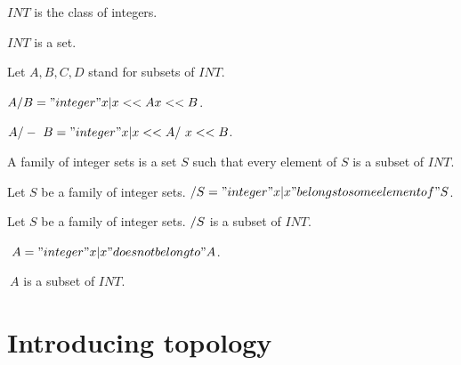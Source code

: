 \documentclass{document}
\begin{document}
  \begin{forthel}
    \begin{definition}
      $INT$ is the class of integers.
    \end{definition}

    \begin{axiom}
      $INT$ is a set.
    \end{axiom}

    Let $A,B,C,D$ stand for subsets of $INT$.

    \begin{definition}[Union]
      $A \-/ B = { "integer" x | x << A \/ x << B }$.
    \end{definition}

    \begin{definition}[Intersection]
      $A /-\ B = { "integer" x | x << A /\ x << B }$.
    \end{definition}

    \begin{definition}[IntegerSets]
      A family of integer sets is a set $S$ such that every element of $S$ is a subset of $INT$.
    \end{definition}

    \begin{definition}[UnionSet]
      Let $S$ be a family of integer sets. $\-/ S = { "integer" x | x "belongs to some element of" S }$.
    \end{definition}

    \begin{lemma}
      Let $S$ be a family of integer sets. $\-/S$ is a subset of $INT$.
    \end{lemma}

    \begin{definition}[Complement]
      $~ A = { "integer" x | x "does not belong to" A }$.
    \end{definition}

    \begin{lemma}
      $~ A$ is a subset of $INT$.
    \end{lemma}
   \end{forthel}


  \section{Introducing topology}
\end{document}
